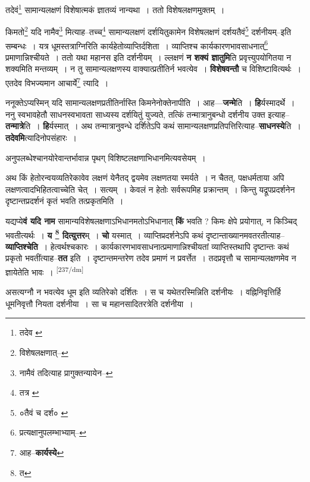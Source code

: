 \documentclass[article,12pt,a4paper]{memoir}
\begin{document}
	तदेवं\footnote{तदेव \cite{dp-edE}} सामान्यलक्षणं विशेषात्मकं ज्ञातव्यं नान्यथा । ततो विशेषलक्षणमुक्तम् । 
	  
	किमतो\footnote{विशेषलक्षणात्--\cite{dp-msD-n}} यदि नामैव\footnote{नामैवं तदित्याह \cite{dp-edE} प्रागुक्तन्यायेन--\cite{dp-msD-n}} मित्याह--तच्च\footnote{तत्र \cite{dp-msA} \cite{dp-msB} \cite{dp-edP} \cite{dp-edH} \cite{dp-edE}} सामान्यलक्षणं दर्शयितुकामेन विशेषलक्षणं दर्शयतैवं\footnote{०तैवं च दर्श० \cite{dp-msB}} दर्शनीयम्--इति सम्बन्धः । यत्र धूमस्तत्राग्निरिति कार्यहेतोव्याप्तिर्दशिता । व्याप्तिश्च कार्यकारणभावसाधनात्\footnote{प्रत्यक्षानुपलम्भाभ्याम्--\cite{dp-msD-n}} प्रमाणान्निश्चीयते । ततो यथा महानस इति दर्शनीयम् । ल्लक्षणं \textbf{न शक्यं ज्ञातुमि}ति प्रवृत्त्युपयोगितया न शक्यमिति मन्तव्यम् । न तु सामान्यलक्षणस्य वाक्यात्प्रतीतिर्न भवत्येव । \textbf{विशेषवन्तौ} च विशिष्टावित्यर्थः । एतदेव विभज्यमान आचार्ये\footnote{आह--\textbf{कार्यस्ये}} त्यादि ।
	\pend
      

	  \pstart ननूक्तेऽप्यस्मिन् यदि सामान्यलक्षणप्रतीतिर्नास्ति किमनेनोक्तेनापीति । आह—\textbf{जन्मे}ति । \textbf{हि}र्यस्मादर्थे । ननु स्वभावहेतौ साधनस्वभावता साध्यस्य दर्शयितुं युज्यते, तत्किं तन्मात्रानुबन्धो दर्शनीय उक्त इत्याह--\textbf{तन्मात्रे}ति । \textbf{हि}र्यस्मात् । अथ तन्मात्रानुवन्धे दर्शितेऽपि कथं सामान्यलक्षणप्रतिपत्तिरित्याह--\textbf{साधनस्ये}ति । \textbf{तदेवमि}त्यादिनोपसंहारः ।
	\pend
      

	  \pstart अनुपलब्धेश्चानयोरेवान्तर्भावान्न पृथग् विशिष्टलक्षणाभिधानमित्यवसेयम् ।
	\pend
      

	  \pstart अथ किं हेतोरन्वयव्यतिरेकावेव लक्षणं येनैतद् द्वयमेव लक्षणतया स्मर्यते । न चैतत्, पक्षधर्मताया अपि लक्षणत्वादभिहितत्वाच्चेति चेत् । सत्यम् । केवलं न हेतोः सर्वरूपमिह प्रक्रान्तम् । किन्तु यद्रूपप्रदर्शनेन दृष्टान्तप्रदर्शनं कृतं भवति तत्प्रकृतमिति ।
	\pend
      

	  \pstart यद्यप्ये\textbf{वं यदि नाम} सामान्यविशेषलक्षणाऽभिधानमतोऽभिधानात् \textbf{किं} भवति ? किमः क्षेपे प्रयोगात्, न किञ्चिद् भवतीत्यर्थः । \textbf{य \footnote{त} दित्युत्तर}म् । \textbf{चो} यस्मात् । व्याप्तिप्रदर्शनेऽपि कथं दृष्टान्ताख्यानमवतरतीत्याह--\textbf{व्याप्तिश्चेति} । हेत्वर्थश्चकारः । कार्यकारणभावसाधनात्प्रमाणान्निश्चीयतां व्याप्तिस्तथापि दृष्टान्तः कथं प्रकृतो भवतींत्याह--\textbf{तत} इति । दृष्टान्तमन्तरेण तदेव प्रमाणं न प्रवर्त्तेत । तदप्रवृत्तौ च सामान्यलक्षणमेव न ज्ञायेतेति भावः ।  \leavevmode\textsuperscript{\rmlatinfont\tiny [237/dm]} 
	  
	असत्यग्नौ न भवत्येव धूम इति व्यतिरेको दर्शितः । स च यथेतरस्मिन्निति दर्शनीयः । वह्निनिवृत्तिर्हि धूमनिवृत्तौ नियता दर्शनीया । सा च महानसादितरत्रेति दर्शनीया । 
	  
\end{document}
